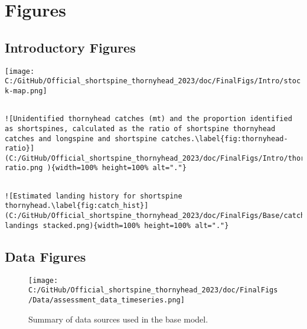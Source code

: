 \documentclass[11pt,
  english,
  letterpaper,
]{article}
\begin{document}
\newpage
\begin{landscape}

\end{landscape}

\clearpage

\hypertarget{figures}{%
\section{Figures}\label{figures}}

\hypertarget{introductory-figures}{%
\subsection{Introductory Figures}\label{introductory-figures}}

\texttt{[image: C:/GitHub/Official\_shortspine\_thornyhead\_2023/doc/FinalFigs/Intro/stock-map.png]} \newpage

\begin{verbatim}

![Unidentified thornyhead catches (mt) and the proportion identified as shortspines, calculated as the ratio of shortspine thornyhead catches and longspine and shortspine catches.\label{fig:thornyhead-ratio}](C:/GitHub/Official_shortspine_thornyhead_2023/doc/FinalFigs/Intro/thornyhead-ratio.png ){width=100% height=100% alt="."}
\end{verbatim}

\newpage

\begin{verbatim}

![Estimated landing history for shortspine thornyhead.\label{fig:catch_hist}](C:/GitHub/Official_shortspine_thornyhead_2023/doc/FinalFigs/Base/catch2 landings stacked.png){width=100% height=100% alt="."}
\end{verbatim}

\hypertarget{data-figures}{%
\subsection{Data Figures}\label{data-figures}}

\begin{figure}
\centering
\texttt{[image: C:/GitHub/Official\_shortspine\_thornyhead\_2023/doc/FinalFigs/Data/assessment\_data\_timeseries.png]}
\caption{Summary of data sources used in the base model.\label{fig:assessment_data_timeseries}}
\end{figure}
\end{document}
